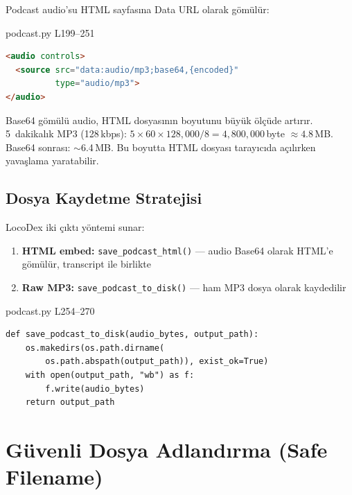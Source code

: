 Podcast audio'su HTML sayfas{\i}na Data URL olarak g\"{o}m\"{u}l\"{u}r:

\begin{kodref}{podcast.py L199--251}
\begin{lstlisting}[caption={HTML i\c{c}ine audio g\"{o}m\"{u}lmesi}, language=HTML]
<audio controls>
  <source src="data:audio/mp3;base64,{encoded}"
          type="audio/mp3">
</audio>
\end{lstlisting}
\end{kodref}

\begin{dikkat}
Base64 g\"{o}m\"{u}l\"{u} audio, HTML dosyas{\i}n{\i}n boyutunu b\"{u}y\"{u}k \"{o}l\c{c}\"{u}de art{\i}r{\i}r. 5~dakikal{\i}k MP3 (128\,kbps): $5 \times 60 \times 128{,}000 / 8 = 4{,}800{,}000$\,byte $\approx 4.8$\,MB. Base64 sonras{\i}: $\sim$6.4\,MB. Bu boyutta HTML dosyas{\i} taray{\i}c{\i}da a\c{c}{\i}l{\i}rken yava\c{s}lama yaratabilir.
\end{dikkat}

\subsection{Dosya Kaydetme Stratejisi}

LocoDex iki \c{c}{\i}kt{\i} y\"{o}ntemi sunar:

\begin{enumerate}
  \item \textbf{HTML embed:} \texttt{save\_podcast\_html()} --- audio Base64 olarak HTML'e g\"{o}m\"{u}l\"{u}r, transcript ile birlikte
  \item \textbf{Raw MP3:} \texttt{save\_podcast\_to\_disk()} --- ham MP3 dosya olarak kaydedilir
\end{enumerate}

\begin{kodref}{podcast.py L254--270}
\begin{lstlisting}[caption={MP3 dosyaya kaydetme}]
def save_podcast_to_disk(audio_bytes, output_path):
    os.makedirs(os.path.dirname(
        os.path.abspath(output_path)), exist_ok=True)
    with open(output_path, "wb") as f:
        f.write(audio_bytes)
    return output_path
\end{lstlisting}
\end{kodref}


\section{G\"{u}venli Dosya Adland{\i}rma (Safe Filename)}
\label{sec:safe_filename}


